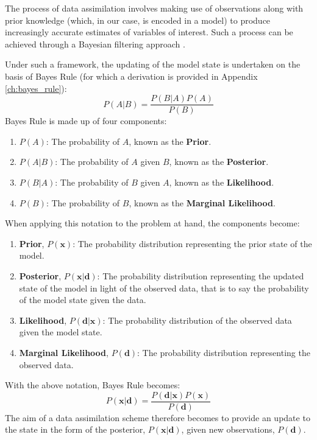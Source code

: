 The process of data assimilation involves making use of observations along with
prior knowledge (which, in our case, is encoded in a model) to produce
increasingly accurate estimates of variables of interest.
Such a process can be achieved through a Bayesian filtering approach
\citep{jazwinski1970mathematics, bar2004estimation}.

Under such a framework, the updating of the model state is undertaken on the
basis of Bayes Rule (for which a derivation is provided in Appendix
\ref{ch:bayes_rule}):
\begin{equation}
    P(A|B) = \frac{P(B|A) P(A)}{P(B)}
\end{equation}
Bayes Rule is made up of four components:
\begin{enumerate}
    \item $P \left( A \right)$: The probability of $A$, known as the
        \textbf{Prior}.
    \item $P \left( A|B \right)$: The probability of $A$ given $B$, known as the
        \textbf{Posterior}.
    \item $P \left( B|A \right)$: The probability of $B$ given $A$, known as the
        \textbf{Likelihood}.
    \item $P \left( B \right)$: The probability of $B$, known as the
        \textbf{Marginal Likelihood}.
\end{enumerate}
When applying this notation to the problem at hand, the components become:
\begin{enumerate}
    \item \textbf{Prior}, $P(\mathbf{x})$: The probability distribution
        representing the prior state of the model.
    \item \textbf{Posterior}, $P(\mathbf{x}|\mathbf{d})$: The probability
        distribution representing the updated state of the model in light of the
        observed data, that is to say the probability of the model state given
        the data.
    \item \textbf{Likelihood}, $P(\mathbf{d}|\mathbf{x})$: The probability
        distribution of the observed data given the model state.
    \item \textbf{Marginal Likelihood}, $P(\mathbf{d})$: The probability
        distribution representing the observed data.
\end{enumerate}
With the above notation, Bayes Rule becomes:
\begin{equation}
    P \left( \mathbf{x} | \mathbf{d} \right) =
       \frac{P \left( \mathbf{d} | \mathbf{x} \right)
             P \left( \mathbf{x} \right)}{P \left( \mathbf{d} \right)} 
\end{equation}
The aim of a data assimilation scheme therefore becomes to provide an update to
the  state in the form of the posterior, $P \left( \mathbf{x} | \mathbf{d}
\right)$, given new observations, $P \left( \mathbf{d} \right)$.

